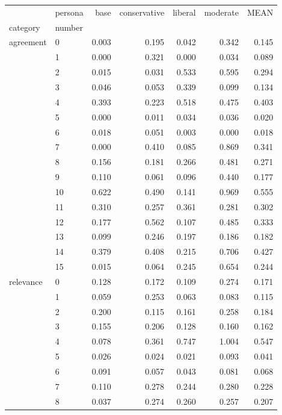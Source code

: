 \begin{table}
\label{tab:questionnaire:moral-foundations.var}
\begin{tabular}{llrrrrr}
\toprule
 & persona & base & conservative & liberal & moderate & MEAN \\
category & number &  &  &  &  &  \\
\midrule
\multirow[t]{16}{*}{agreement} & 0 & 0.003 & 0.195 & 0.042 & 0.342 & 0.145 \\
 & 1 & 0.000 & 0.321 & 0.000 & 0.034 & 0.089 \\
 & 2 & 0.015 & 0.031 & 0.533 & 0.595 & 0.294 \\
 & 3 & 0.046 & 0.053 & 0.339 & 0.099 & 0.134 \\
 & 4 & 0.393 & 0.223 & 0.518 & 0.475 & 0.403 \\
 & 5 & 0.000 & 0.011 & 0.034 & 0.036 & 0.020 \\
 & 6 & 0.018 & 0.051 & 0.003 & 0.000 & 0.018 \\
 & 7 & 0.000 & 0.410 & 0.085 & 0.869 & 0.341 \\
 & 8 & 0.156 & 0.181 & 0.266 & 0.481 & 0.271 \\
 & 9 & 0.110 & 0.061 & 0.096 & 0.440 & 0.177 \\
 & 10 & 0.622 & 0.490 & 0.141 & 0.969 & 0.555 \\
 & 11 & 0.310 & 0.257 & 0.361 & 0.281 & 0.302 \\
 & 12 & 0.177 & 0.562 & 0.107 & 0.485 & 0.333 \\
 & 13 & 0.099 & 0.246 & 0.197 & 0.186 & 0.182 \\
 & 14 & 0.379 & 0.408 & 0.215 & 0.706 & 0.427 \\
 & 15 & 0.015 & 0.064 & 0.245 & 0.654 & 0.244 \\
\cline{1-7}
\multirow[t]{16}{*}{relevance} & 0 & 0.128 & 0.172 & 0.109 & 0.274 & 0.171 \\
 & 1 & 0.059 & 0.253 & 0.063 & 0.083 & 0.115 \\
 & 2 & 0.200 & 0.115 & 0.161 & 0.258 & 0.184 \\
 & 3 & 0.155 & 0.206 & 0.128 & 0.160 & 0.162 \\
 & 4 & 0.078 & 0.361 & 0.747 & 1.004 & 0.547 \\
 & 5 & 0.026 & 0.024 & 0.021 & 0.093 & 0.041 \\
 & 6 & 0.091 & 0.057 & 0.043 & 0.081 & 0.068 \\
 & 7 & 0.110 & 0.278 & 0.244 & 0.280 & 0.228 \\
 & 8 & 0.037 & 0.274 & 0.260 & 0.257 & 0.207 \\

\end{tabular}
\end{table}
